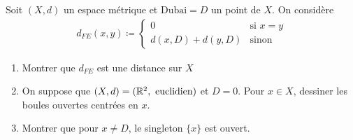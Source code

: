 \documentclass[french,a4paper,10pt]{article}
\begin{document}
	\medspace
	\begin{td-exo}
		Soit $(X, d)$ un espace métrique et $\text{Dubai}=D$ un point de $X$. On considère
		\[\begin{aligned}
			d_{FE}(x, y)\coloneq\begin{cases}
				0&\text{si }x=y\\
				d(x, D)+d(y, D)&\text{sinon}
			\end{cases}
		\end{aligned}\]
		
		\begin{enumerate}
			\item Montrer que $d_{FE}$ est une distance sur $X$
			\item On suppose que $(X, d)=(\mathbb{R}^2, \text{ euclidien})$ et $D=0$. Pour $x\in X$, dessiner les boules ouvertes centrées en $x$.
			\item Montrer que pour $x\ne D$, le singleton $\{x\}$ est ouvert.
		\end{enumerate}
	\end{td-exo}
	\newpage
\end{document}
